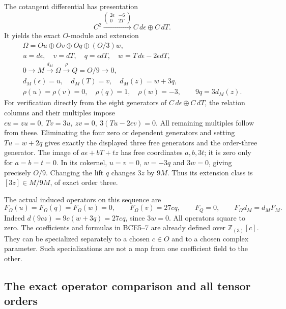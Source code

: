 The cotangent differential has presentation
\[
C^2\xrightarrow{\left(\begin{smallmatrix}2\epsilon&-6\\0&2T
\end{smallmatrix}\right)} C\,d\epsilon\oplus C\,dT .
\]
It yields the exact \(O\)-module and extension
\begin{equation}\tag{BCE6}
\begin{gathered}
\Omega=Ou\oplus Ov\oplus Oq\oplus(O/3)w,\\
u=d\epsilon,\quad v=dT,\quad q=\epsilon dT,\quad
w=T\,d\epsilon-2\epsilon dT,\\
0\longrightarrow M\xrightarrow{d_M}\Omega
\xrightarrow{\rho}Q=O/9\longrightarrow0,\\
d_M(\epsilon)=u,\quad d_M(T)=v,\quad d_M(z)=w+3q,\\
\rho(u)=\rho(v)=0,\quad\rho(q)=1,\quad\rho(w)=-3,\qquad
9q=3d_M(z).
\end{gathered}
\end{equation}
For verification directly from the eight generators of
\(C\,d\epsilon\oplus C\,dT\), the relation columns and their
multiples impose
\(\epsilon u=zu=0,\ Tv=3u,\ zv=0,\ 3(Tu-2\epsilon v)=0\).
All remaining multiples follow from these. Eliminating the four
zero or dependent generators and setting \(Tu=w+2q\) gives exactly
the displayed three free generators and the order-three generator.
The image of \(a\epsilon+bT+tz\) has free coordinates \(a,b,3t\);
it is zero only for \(a=b=t=0\). In its cokernel, \(u=v=0\),
\(w=-3q\) and \(3w=0\), giving precisely \(O/9\).
Changing the lift \(q\) changes \(3z\) by \(9M\).
Thus its extension class is \([3z]\in M/9M\), of exact order three.

The actual induced operators on this sequence are
\begin{equation}\tag{BCE7}
F_\Omega(u)=F_\Omega(q)=F_\Omega(w)=0,\qquad
F_\Omega(v)=27cq,\qquad F_Q=0,\qquad F_\Omega d_M=d_MF_M .
\end{equation}
Indeed \(d(9cz)=9c(w+3q)=27cq\), since \(3w=0\).
All operators square to zero. The coefficients and formulas in
BCE5--7 are already defined over \(\mathbb Z_{(3)}[c]\).
They can be specialized separately to a chosen \(c\in O\) and to a
chosen complex parameter. Such specializations are not a map from
one coefficient field to the other.

\subsection{The exact operator comparison and all tensor orders}

